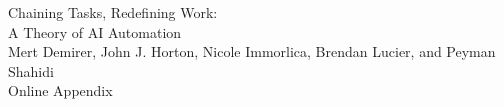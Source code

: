 \documentclass[12pt, final]{article}
\begin{document}
\clearpage
\renewcommand\thefigure{OA-\arabic{figure}}
\renewcommand\thetable{OA-\arabic{table}}
\renewcommand*{\thepage}{OA - \arabic{page}}

\renewcommand\thedefinition{OA-\arabic{definition}}
\renewcommand\thelemma{OA-\arabic{lemma}}
\renewcommand\theassumption{OA-\arabic{assumption}}
\renewcommand\theconstraint{OA-\arabic{constraint}}
\renewcommand\theproposition{OA-\arabic{proposition}}
\renewcommand\thecorollary{OA-\arabic{corollary}}
\renewcommand\thetheorem{OA-\arabic{theorem}}
\renewcommand\theobservation{OA-\arabic{observation}}
\renewcommand\theexample{OA-\arabic{example}}
\renewcommand\thefigure{OA-\arabic{figure}}
\renewcommand\thetable{OA-\arabic{table}}
\renewcommand\theequation{OA.\arabic{equation}}
\renewcommand*{\thepage}{OA - \arabic{page}}
\newcommand{\appendixletter}{\Alph{section}}

\setcounter{figure}{0}
\setcounter{table}{0}
\setcounter{page}{1}
\setcounter{definition}{0}
\setcounter{lemma}{0}
\setcounter{assumption}{0}
\setcounter{constraint}{0}
\setcounter{proposition}{0}
\setcounter{corollary}{0}
\setcounter{theorem}{0}
\setcounter{observation}{0}
\setcounter{example}{0}
\setcounter{figure}{0}
\setcounter{table}{0}
\setcounter{equation}{0}
\setcounter{section}{0}

\pagestyle{empty}
\begin{center}
	{\LARGE Chaining Tasks, Redefining Work: \\ A Theory of AI Automation}\\[1em]
	\large Mert Demirer, John J. Horton, Nicole Immorlica, Brendan Lucier, and Peyman Shahidi \\[1em]
	\Large Online Appendix \\[1em]
\end{center}

\setcounter{tocdepth}{2}
\makeatletter\xdef\Etoc@savedtocdepth{\number\c@tocdepth}\makeatother
{}
\cftsetpnumwidth{3.9em}
\cftsetrmarg{4.9em}
\tableofcontents
\clearpage
\pagestyle{plain}
\renewcommand*{\thepage}{OA - \arabic{page}}
\end{document}
